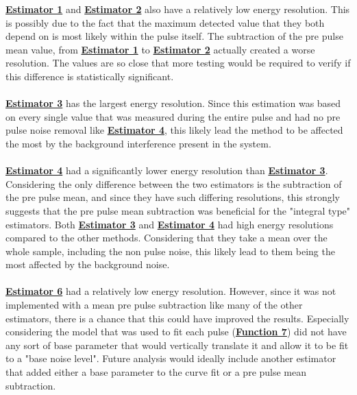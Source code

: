 \documentclass[
	letterpaper, %
	10pt, %
]{template}
\newcommand{\bref}[2]{\textbf{\hyperref[#1]{#2}}}
\begin{document}
\bref{est-1}{Estimator 1} and \bref{est-2}{Estimator 2} also have a relatively low energy resolution. This is possibly due to the fact that the maximum detected value that they both depend on is most likely within the pulse itself. The subtraction of the pre pulse mean value, from \bref{est-1}{Estimator 1} to \bref{est-2}{Estimator 2} actually created a worse resolution. The values are so close that more testing would be required to verify if this difference is statistically significant.\\\\
\bref{est-3}{Estimator 3} has the largest energy resolution. Since this estimation was based on every single value that was measured during the entire pulse and had no pre pulse noise removal like \bref{est-4}{Estimator 4}, this likely lead the method to be affected the most by the background interference present in the system.\\\\
\bref{est-4}{Estimator 4} had a significantly lower energy resolution than \bref{est-3}{Estimator 3}. Considering the only difference between the two estimators is the subtraction of the pre pulse mean, and since they have such differing resolutions, this strongly suggests that the pre pulse mean subtraction was beneficial for the "integral type" estimators. Both \bref{est-3}{Estimator 3} and \bref{est-4}{Estimator 4} had  high energy resolutions compared to the other methods. Considering that they take a mean over the whole sample, including the non pulse noise, this likely lead to them being the most affected by the background noise.\\\\
\bref{est-6}{Estimator 6} had a relatively low energy resolution. However, since it was not implemented with a mean pre pulse subtraction like many of the other estimators, there is a chance that this could have improved the results. Especially considering the model that was used to fit each pulse (\textbf{\hyperref[lst-7]{Function 7}}) did not have any sort of base parameter that would vertically translate it and allow it to be fit to a "base noise level". Future analysis would ideally include another estimator that added either a base parameter to the curve fit or a pre pulse mean subtraction.
\end{document}

